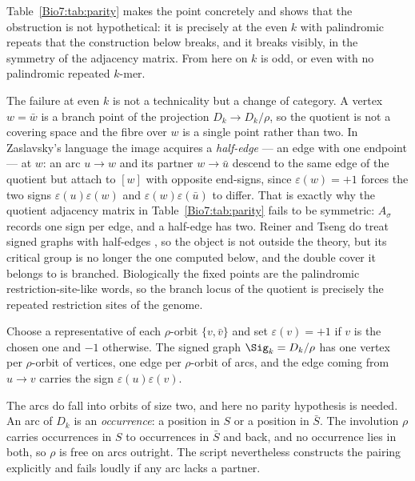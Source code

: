 Table~\ref{Bio7:tab:parity} makes the point concretely and shows that the obstruction is not
hypothetical: it is precisely at the even $k$ with palindromic repeats that the construction
below breaks, and it breaks visibly, in the symmetry of the adjacency matrix. From here on
$k$ is odd, or even with no palindromic repeated $k$-mer.

\begin{remark}\label{Bio7:rem:halfedge}
The failure at even $k$ is not a technicality but a change of category. A vertex $w=\bar w$
is a branch point of the projection $D_k\to D_k/\rho$, so the quotient is not a covering
space and the fibre over $w$ is a single point rather than two. In Zaslavsky's language the
image acquires a \emph{half-edge} --- an edge with one endpoint --- at $w$: an arc $u\to w$
and its partner $w\to\bar u$ descend to the same edge of the quotient but attach to $[w]$
with opposite end-signs, since $\varepsilon(w)=+1$ forces the two signs
$\varepsilon(u)\varepsilon(w)$ and $\varepsilon(w)\varepsilon(\bar u)$ to differ. That is
exactly why the quotient adjacency matrix in Table~\ref{Bio7:tab:parity} fails to be symmetric:
$A_\sigma$ records one sign per edge, and a half-edge has two. Reiner and Tseng do treat
signed graphs with half-edges \cite[\S9]{RT14}, so the object is not outside the theory, but
its critical group is no longer the one computed below, and the double cover it belongs to is
branched. Biologically the fixed points are the palindromic restriction-site-like words, so
the branch locus of the quotient is precisely the repeated restriction sites of the genome.
\end{remark}

\begin{definition}\label{Bio7:def:sigma}
Choose a representative of each $\rho$-orbit $\{v,\bar v\}$ and set $\varepsilon(v)=+1$ if
$v$ is the chosen one and $-1$ otherwise. The signed graph $\Sig_k=D_k/\rho$ has one vertex
per $\rho$-orbit of vertices, one edge per $\rho$-orbit of arcs, and the edge coming from
$u\to v$ carries the sign $\varepsilon(u)\varepsilon(v)$.
\end{definition}

The arcs do fall into orbits of size two, and here no parity hypothesis is needed. An arc of
$D_k$ is an \emph{occurrence}: a position in $S$ or a position in $\bar S$. The involution
$\rho$ carries occurrences in $S$ to occurrences in $\bar S$ and back, and no occurrence lies
in both, so $\rho$ is free on arcs outright. The script nevertheless constructs the pairing
explicitly and fails loudly if any arc lacks a partner.

